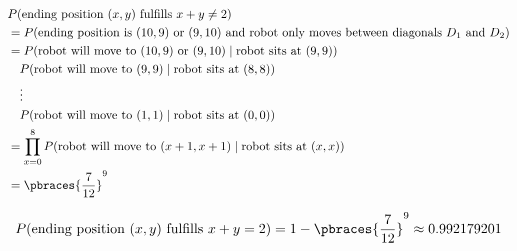 \begin{solution}
\begin{enumerate}[label = (\alph*)]
    \begin{align*}
        &
        P(\text{ending position $(x, y)$ fulfills $x + y \neq 2$}) \\
        & =
        P(\text{ending position is $(10, 9)$ or $(9, 10)$ and robot only moves between diagonals $D_1$ and $D_2$}) \\
        & =
        P(\text{robot will move to $(10, 9)$ or $(9, 10)$} \mid \text{robot sits at $(9, 9)$}) \\
        & \quad
        P(\text{robot will move to $(9, 9)$} \mid \text{robot sits at $(8, 8)$}) \\
        & \quad
        \vdots \\
        & \quad
        P(\text{robot will move to $(1, 1)$} \mid \text{robot sits at $(0, 0)$}) \\
        & =
        \prod_{x=0}^8
            P(\text{robot will move to $(x+1, x+1)$} \mid \text{robot sits at $(x, x)$}) \\
        & =
        \pbraces{\frac{7}{12}}^9
    \end{align*}

    \begin{align*}
        P(\text{ending position $(x, y)$ fulfills $x + y = 2$})
        =
        1 - \pbraces{\frac{7}{12}}^9
        \approx
        0.992179201
    \end{align*}

\end{enumerate}

\end{solution}

